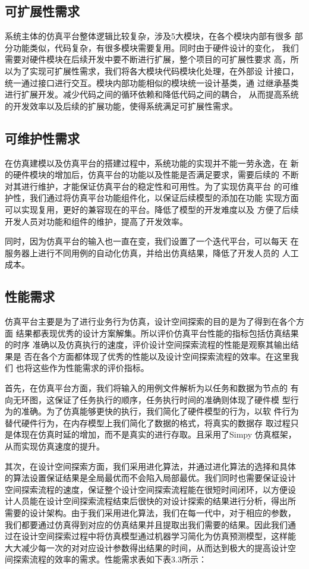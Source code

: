 \subsection{可扩展性需求}
系统主体的仿真平台整体逻辑比较复杂，涉及5大模块，在各个模块内部有很多
部分功能类似，代码复杂，有很多模块需要复用。同时由于硬件设计的变化，
我们需要对硬件模块在后续开发中要不断进行扩展，整个项目的可扩展性要求
高，所以为了实现可扩展性需求，我们将各大模块代码模块化处理，在外部设
计接口，统一通过接口进行交互。模块内部功能相似的模块统一设计基类，通
过继承基类进行扩展开发。减少代码之间的循环依赖和降低代码之间的耦合，
从而提高系统的开发效率以及后续的扩展功能，使得系统满足可扩展性需求。

\subsection{可维护性需求}
在仿真建模以及仿真平台的搭建过程中，系统功能的实现并不能一劳永逸，在
新的硬件模块的增加后，仿真平台的功能以及性能是否满足要求，需要后续的
不断对其进行维护，才能保证仿真平台的稳定性和可用性。为了实现仿真平台
的可维护性，我们通过将仿真平台功能组件化，以保证后续模型的添加在功能
实现方面可以实现复用，更好的兼容现在的平台。降低了模型的开发难度以及
方便了后续开发人员对功能和组件的维护，提高了开发效率。

同时，因为仿真平台的输入也一直在变，我们设置了一个迭代平台，可以每天
在服务器上进行不同用例的自动化仿真，并给出仿真结果，降低了开发人员的
人工成本。

\subsection{性能需求}
仿真平台主要是为了进行业务行为仿真，设计空间探索的目的是为了得到在各个方面
结果都表现优秀的设计方案解集。所以评价仿真平台性能的指标包括仿真结果的时序
准确以及仿真执行的速度，评价设计空间探索流程的性能是观察其输出结果是
否在各个方面都体现了优秀的性能以及设计空间探索流程的效率。在这里我们
也将这些作为性能需求的评价指标。

首先，在仿真平台方面，我们将输入的用例文件解析为以任务和数据为节点的
有向无环图，这保证了任务执行的顺序，任务执行时间的准确则体现了硬件模
型行为的准确。为了仿真能够更快的执行，我们简化了硬件模型的行为，以软
件行为替代硬件行为，在内存模型上我们简化了数据的格式，将真实的数据存
取过程只是体现在仿真时延的增加，而不是真实的进行存取。且采用了Simpy
仿真框架，从而实现仿真速度的提升。

其次，在设计空间探索方面，我们采用进化算法，并通过进化算法的选择和具体
的算法设置保证结果是全局最优而不会陷入局部最优。我们同时也需要保证设计
空间探索流程的速度，保证整个设计空间探索流程能在很短时间闭环，以方便设
计人员能在设计空间探索流程结束后很快的对设计探索的结果进行分析，得出所
需要的设计架构。由于我们采用进化算法，我们在每一代中，对于相应的参数，
我们都要通过仿真得到对应的仿真结果并且提取出我们需要的结果。因此我们通
过在设计空间探索过程中将仿真模型通过机器学习简化为仿真预测模型，这样能
大大减少每一次的对对应设计参数得出结果的时间，从而达到极大的提高设计空
间探索流程的效率的需求。性能需求表如下表3.3所示：

